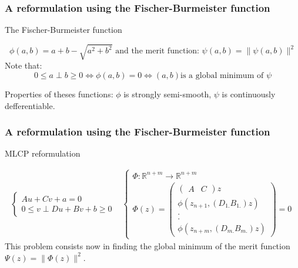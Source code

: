 
\frame
{
\frametitle{A reformulation using the Fischer-Burmeister function}
\begin{block}{ The Fischer-Burmeister function}
 
\[\phi (a,b) = a+b-\sqrt{a^2+b^2} \textrm{ and the merit function: } \psi (a,b) = \| \psi(a,b)\|^2 \]
Note that:
\[  0 \le a \perp     b   \ge 0 \Longleftrightarrow \phi (a,b) =0 \Longleftrightarrow (a,b) \textrm{is a
global minimum of } \psi \]
\end{block}

 Properties of theses functions: $\phi$ is strongly semi-smooth, $\psi$ is continuously defferentiable.

\begin{figure}[h]
\centerline{
 \scalebox{0.35}{
    
    
 }
}
\end{figure}

 

}

\frame
{
\frametitle{A reformulation using the Fischer-Burmeister function}


\begin{block}{ MLCP reformulation}

\begin{equation}
  \begin{array}{cc}
   \begin{cases}
    A u + C v + a =0 \\
    {0} \le {v} \perp     Du +B v +b   \ge {0}
    \end{cases}&
   \begin{cases}
   \Phi :\mathbb{R}^{n+m} \longrightarrow \mathbb{R}^{n+m}\\
   \Phi(z)=\left(\begin{array}{c}
   \left(\begin{array}{cc}
   A&C
   \end{array}\right)z\\
   \phi(z_{n+1},(D_{1.}B_{1.})z)\\
   .\\
   .\\
   \phi(z_{n+m},(D_{m.}B_{m.})z)
   \end{array}\right)=0
    \end{cases}
  \end{array}
\end{equation}
This problem consists now in finding the global minimum of the merit function $\Psi(z)=\| \Phi(z)\|^2$.
 
\end{block}




}


